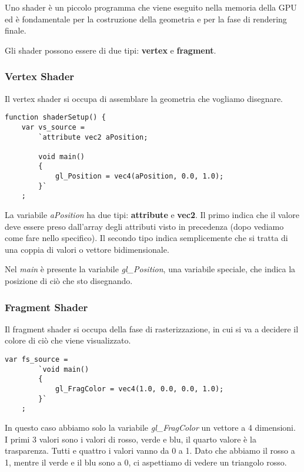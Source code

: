 Uno shader \`e un piccolo programma che viene eseguito nella memoria della GPU ed \`e
fondamentale per la costruzione della geometria e per la fase di rendering finale.

Gli shader possono essere di due tipi: \textbf{vertex} e \textbf{fragment}.

\subsubsection{Vertex Shader}
Il vertex shader si occupa di assemblare la geometria che vogliamo disegnare.
\begin{lstlisting}[style=js]
function shaderSetup() {
	var vs_source =
		`attribute vec2 aPosition;
		
		void main()
		{
			gl_Position = vec4(aPosition, 0.0, 1.0);
		}`
	;
\end{lstlisting}
La variabile \emph{aPosition} ha due tipi: \textbf{attribute} e \textbf{vec2}. Il primo
indica che il valore deve essere preso dall'array degli attributi visto in precedenza
(dopo vediamo come fare nello specifico). Il secondo tipo indica semplicemente che
si tratta di una coppia di valori o vettore bidimensionale.

Nel \emph{main} \`e presente la variabile \emph{gl\_Position}, una variabile speciale, che
indica la posizione di ci\`o che sto disegnando.

\subsubsection{Fragment Shader}
Il fragment shader si occupa della fase di rasterizzazione, in cui si va a decidere il
colore di ci\`o che viene visualizzato.
\begin{lstlisting}[style=js, firstnumber=8]
	var fs_source =
		`void main()
		{
			gl_FragColor = vec4(1.0, 0.0, 0.0, 1.0);
		}`
	;
\end{lstlisting}
In questo caso abbiamo solo la variabile \emph{gl\_FragColor} un vettore a 4 dimensioni.
I primi 3 valori sono i valori di rosso, verde e blu, il quarto valore \`e la trasparenza.
Tutti e quattro i valori vanno da 0 a 1. Dato che abbiamo il rosso a 1, mentre il verde e
il blu sono a 0, ci aspettiamo di vedere un triangolo rosso.

